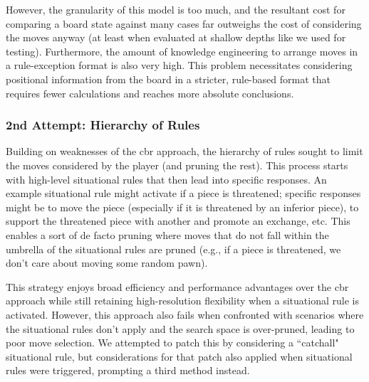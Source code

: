 \documentclass[letterpaper]{article}
\begin{document}
However, the granularity of this model is too much, and the resultant cost for comparing a board state against many cases far outweighs the cost of considering the moves anyway (at least when evaluated at shallow depths like we used for testing).  Furthermore, the amount of knowledge engineering to arrange moves in a rule-exception format is also very high.  This problem necessitates considering positional information from the board in a stricter, rule-based format that requires fewer calculations and reaches more absolute conclusions.

\subsubsection{2nd Attempt: Hierarchy of Rules}
Building on weaknesses of the \acrshort{cbr} approach, the hierarchy of rules sought to limit the moves considered by the player (and pruning the rest).  This process starts with high-level situational rules that then lead into specific responses.  An example situational rule might activate if a piece is threatened; specific responses might be to move the piece (especially if it is threatened by an inferior piece), to support the threatened piece with another and promote an exchange, etc.  This enables a sort of de facto pruning where moves that do not fall within the umbrella of the situational rules are pruned (e.g., if a piece is threatened, we don't care about moving some random pawn).

This strategy enjoys broad efficiency and performance advantages over the \acrshort{cbr} approach while still retaining high-resolution flexibility when a situational rule is activated.  However, this approach also fails when confronted with scenarios where the situational rules don't apply and the search space is over-pruned, leading to poor move selection.  We attempted to patch this by considering a ``catchall" situational rule, but considerations for that patch also applied when situational rules were triggered, prompting a third method instead.
\end{document}

